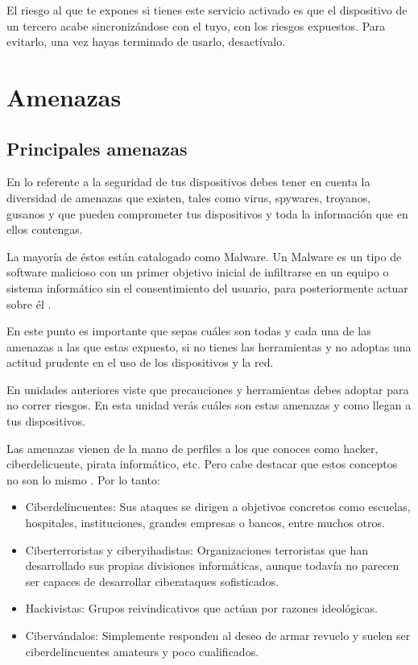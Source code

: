 \documentclass[
  a4paper,
  openany]{book}
\begin{document}
El riesgo al que te expones si tienes este servicio activado es que el dispositivo de un tercero acabe sincronizándose con el tuyo, con los riesgos expuestos. Para evitarlo, una vez hayas terminado de usarlo, desactívalo.

\hypertarget{amenazas}{%
\chapter{Amenazas}\label{amenazas}}

\hypertarget{principales-amenazas}{%
\section{Principales amenazas}\label{principales-amenazas}}

En lo referente a la seguridad de tus dispositivos debes tener en cuenta la diversidad de amenazas que existen, tales como virus, spywares, troyanos, gusanos y que pueden comprometer tus dispositivos y toda la información que en ellos contengas.

La mayoría de éstos están catalogado como Malware. Un Malware es un tipo de software malicioso con un primer objetivo inicial de infiltrarse en un equipo o sistema informático sin el consentimiento del usuario, para posteriormente actuar sobre él \citep{WIKI-malware}.

En este punto es importante que sepas cuáles son todas y cada una de las amenazas a las que estas expuesto, si no tienes las herramientas y no adoptas una actitud prudente en el uso de los dispositivos y la red.

En unidades anteriores viste que precauciones y herramientas debes adoptar para no correr riesgos. En esta unidad verás cuáles son estas amenazas y como llegan a tus dispositivos.

Las amenazas vienen de la mano de perfiles a los que conoces como hacker, ciberdelicuente, pirata informático, etc. Pero cabe destacar que estos conceptos no son lo mismo \citep{OSPI-ciberseguridad-espana}. Por lo tanto:

\begin{itemize}
\item
  Ciberdelincuentes: Sus ataques se dirigen a objetivos concretos como escuelas, hospitales, instituciones, grandes empresas o bancos, entre muchos otros.
\item
  Ciberterroristas y ciberyihadistas: Organizaciones terroristas que han desarrollado sus propias divisiones informáticas, aunque todavía no parecen ser capaces de desarrollar ciberataques sofisticados.
\item
  Hackivistas: Grupos reivindicativos que actúan por razones ideológicas.
\item
  Cibervándalos: Simplemente responden al deseo de armar revuelo y suelen ser ciberdelincuentes amateurs y poco cualificados.
\end{itemize}
\end{document}
